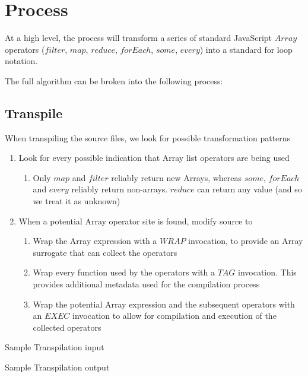 \section{Process}

At a high level, the process will transform a series of standard JavaScript $Array$ operators ($filter$, $map$,  $reduce$, $forEach$, $some$, $every$) into a standard for loop notation.  

The full algorithm can be broken into the following process:

\subsection{Transpile}
When transpiling the source files, we look for possible transformation patterns
  \begin{enumerate}
    \item Look for every possible indication that Array list operators are being used
    \begin{enumerate}
      \item Only $map$ and $filter$ reliably return new Arrays, whereas $some$, 
        $forEach$ and $every$ reliably return non-arrays.  $reduce$ can return 
        any value (and so we treat it as unknown)    
    \end{enumerate}
    \item When a potential Array operator site is found, modify source to
    \begin{enumerate} 
      \item	Wrap the Array expression with a $WRAP$ invocation, to provide an Array surrogate that can collect the operators
      \item	Wrap every function used by the operators with a $TAG$ invocation.  This provides additional metadata used for the compilation process
      \item	Wrap the potential Array expression and the subsequent operators with an $EXEC$ invocation to allow for compilation and execution of the collected operators
    \end{enumerate}    
  \end{enumerate}

  Sample Transpilation input  

  Sample Transpilation output  


